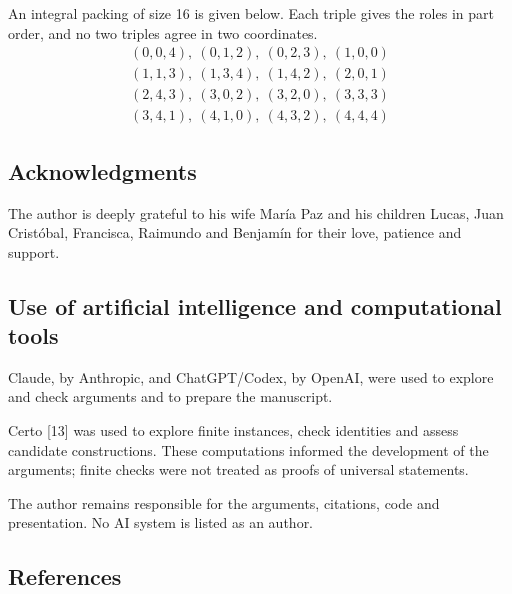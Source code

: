 \documentclass[english,11pt,a4paper]{article}
\begin{document}
An integral packing of size 16 is given below. Each triple gives the roles in part order, and no two triples agree in two coordinates.
\[\begin{gathered}
(0,0,4),\ (0,1,2),\ (0,2,3),\ (1,0,0)\\
(1,1,3),\ (1,3,4),\ (1,4,2),\ (2,0,1)\\
(2,4,3),\ (3,0,2),\ (3,2,0),\ (3,3,3)\\
(3,4,1),\ (4,1,0),\ (4,3,2),\ (4,4,4)
\end{gathered}\]

\subsection{Acknowledgments}\label{acknowledgments}

The author is deeply grateful to his wife María Paz and his children Lucas, Juan Cristóbal, Francisca, Raimundo and Benjamín for their love, patience and support.

\subsection{Use of artificial intelligence and computational tools}\label{use-of-artificial-intelligence-and-computational-tools}

Claude, by Anthropic, and ChatGPT/Codex, by OpenAI, were used to explore and check arguments and to prepare the manuscript.

Certo {[}13{]} was used to explore finite instances, check identities and assess candidate constructions. These computations informed the development of the arguments; finite checks were not treated as proofs of universal statements.

The author remains responsible for the arguments, citations, code and presentation. No AI system is listed as an author.

\subsection{References}\label{references}
\end{document}
